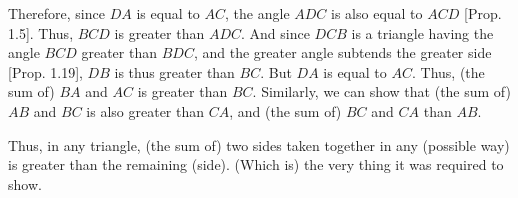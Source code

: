 \begin{Parallel}{}{}
{Therefore, since $DA$ is equal to $AC$, the angle $ADC$ is also equal to
$ACD$ [Prop. 1.5]. Thus, $BCD$ is greater than $ADC$. And since
 $DCB$ is a triangle having the angle $BCD$ greater than $BDC$, and the
greater angle subtends the greater side [Prop. 1.19], $DB$ is thus
greater than $BC$. But $DA$ is equal to $AC$. Thus, (the sum of) $BA$ and $AC$ is
greater than $BC$. Similarly, we can show that (the sum of) $AB$ and $BC$ is also
greater than $CA$, and (the sum of) $BC$ and $CA$ than $AB$.

Thus, in any triangle, (the sum of) two sides taken together in any (possible way) is greater than the remaining (side). (Which is) the very thing
it was required to show.}
\end{Parallel}

